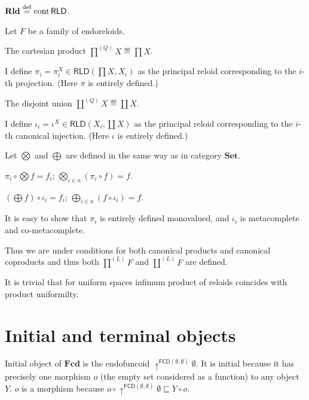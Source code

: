 \begin{defn}
  $\mathbf{Rld} \overset{\mathrm{def}}{=} \operatorname{cont} \mathsf{RLD}$.
\end{defn}

Let $F$ be a family of endoreloids.

The cartesian product $\prod^{(Q)} X \eqdef \prod X$.

I define $\pi_i = \pi^X_i \in \mathsf{RLD} \left( \prod X , X_i
\right)$ as the principal reloid corresponding to the $i$-th projection. (Here
$\pi$ is entirely defined.)

The disjoint union $\coprod^{(Q)} X \eqdef \coprod X$.

I define $\iota_i = \iota^X \in
\mathsf{RLD} \left( X_i , \coprod X \right)$ as the principal reloid
corresponding to the $i$-th canonical injection. (Here $\iota$ is entirely
defined.)

Let $\bigotimes$ and $\bigoplus$ are defined in the same way as in category
$\mathbf{Set}$.

\begin{obvious}
$\pi_i \circ \bigotimes f = f_i$; $\bigotimes_{i \in n} (\pi_i \circ f) =
f$.
\end{obvious}

\begin{obvious}
$\left( \bigoplus f \right) \circ \iota_i = f_i$; $\bigoplus_{i \in n} (f
\circ \iota_i) = f$.
\end{obvious}

It is easy to show that $\pi_i$ is entirely defined monovalued, and $\iota_i$
is metacomplete and co-metacomplete.

Thus we are under conditions for both canonical products and canonical
coproducts and thus both $\prod^{(L)} F$ and $\coprod^{(L)} F$ are defined.

It is trivial that for uniform spaces infimum product of reloids coincides
with product uniformilty.

\section{Initial and terminal objects}

Initial object of $\mathbf{Fcd}$ is the endofuncoid
$\uparrow^{\mathsf{FCD} (\emptyset , \emptyset)} \emptyset$. It is
initial because it has precisely one morphism $o$ (the empty set considered as
a function) to any object $Y$. $o$ is a morphism because $o \circ
\uparrow^{\mathsf{FCD} (\emptyset , \emptyset)} \emptyset \sqsubseteq Y
\circ o$.

